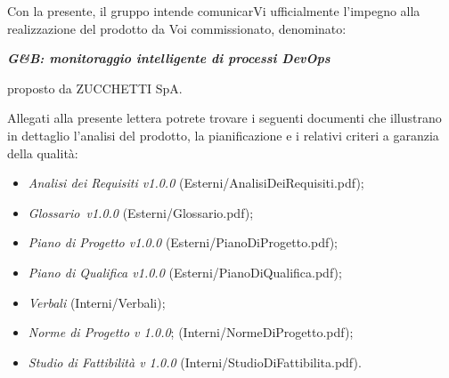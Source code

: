 \documentclass[12pt]{newlfm}
\begin{document}
	\begin{newlfm}
		Con la presente, il gruppo \GroupName intende comunicarVi ufficialmente l'impegno alla realizzazione del prodotto da Voi commissionato, denominato:
		\begin{center}
			\textbf{\textit{G\&B: monitoraggio intelligente di processi DevOps}}
		\end{center}
		proposto da ZUCCHETTI SpA.
		
		Allegati alla presente lettera potrete trovare i seguenti documenti che illustrano in dettaglio l'analisi del prodotto, la pianificazione e i relativi criteri a garanzia della qualità:
		
		\begin{itemize}
			\item \textit{Analisi dei Requisiti v1.0.0} (Esterni/AnalisiDeiRequisiti.pdf);
			\item \textit{Glossario\ v1.0.0} (Esterni/Glossario.pdf);
			\item \textit{Piano di Progetto v1.0.0} (Esterni/PianoDiProgetto.pdf);
			\item \textit{Piano di Qualifica v1.0.0} (Esterni/PianoDiQualifica.pdf);
			\item \textit{Verbali} (Interni/Verbali);
			\item \textit{Norme di Progetto v 1.0.0}; (Interni/NormeDiProgetto.pdf);
			\item \textit{Studio di Fattibilità v 1.0.0} (Interni/StudioDiFattibilita.pdf).
		\end{itemize}
		

\end{newlfm}
\end{document}
